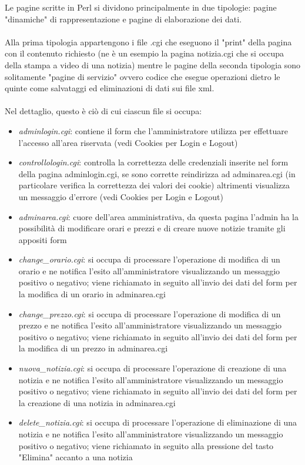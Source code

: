 \documentclass[12pt]{article}
\begin{document}
				  Le pagine scritte in Perl si dividono principalmente in due tipologie: pagine "dinamiche" di rappresentazione e pagine di elaborazione dei dati.\\ \\
				Alla prima tipologia appartengono i file .cgi che eseguono il "print" della pagina con il contenuto richiesto (ne \`e un esempio la pagina notizia.cgi che si occupa della stampa a video di una notizia) mentre le pagine della seconda tipologia sono solitamente "pagine di servizio" ovvero codice che esegue operazioni dietro le quinte come salvataggi ed eliminazioni di dati sui file xml. \\ \\Nel dettaglio, questo \`e ci\`o di cui ciascun file si occupa:
\begin{itemize}
\item \textit{adminlogin.cgi}: contiene il form che l'amministratore utilizza per effettuare l'accesso all'area riservata (vedi Cookies per Login e Logout)
\item \textit{controllologin.cgi}: controlla la correttezza delle credenziali inserite nel form della pagina adminlogin.cgi, se sono corrette reindirizza ad adminarea.cgi (in particolare verifica la correttezza dei valori dei cookie) altrimenti visualizza un messaggio d'errore (vedi Cookies per Login e Logout)
\item \textit{adminarea.cgi}: cuore dell'area amministrativa, da questa pagina l'admin ha la possibilit\`a di modificare orari e prezzi e di creare nuove notizie tramite gli appositi form
\item \textit{change\_orario.cgi}: si occupa di processare l'operazione di modifica di un orario e ne notifica l'esito all'amministratore visualizzando un messaggio positivo o negativo; viene richiamato in seguito all'invio dei dati del form per la modifica di un orario in adminarea.cgi
\item \textit{change\_prezzo.cgi}: si occupa di processare l'operazione di modifica di un prezzo e ne notifica l'esito all'amministratore visualizzando un messaggio positivo o negativo; viene richiamato in seguito all'invio dei dati del form per la modifica di un prezzo in adminarea.cgi
\item \textit{nuova\_notizia.cgi}: si occupa di processare l'operazione di creazione di una notizia e ne notifica l'esito all'amministratore visualizzando un messaggio positivo o negativo; viene richiamato in seguito all'invio dei dati del form per la creazione di una notizia in adminarea.cgi
\item \textit{delete\_notizia.cgi}: si occupa di processare l'operazione di eliminazione di una notizia e ne notifica l'esito all'amministratore visualizzando un messaggio positivo o negativo; viene richiamato in seguito alla pressione del tasto "Elimina" accanto a una notizia

\end{itemize}
\end{document}
